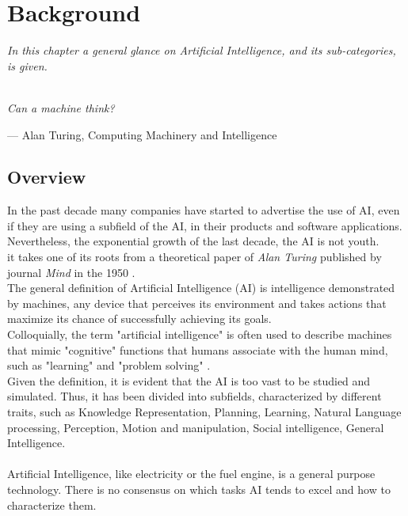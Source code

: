 \chapter{Background}
\textit{In this chapter a general glance on Artificial Intelligence, and its sub-categories, is given.}\\\\

\epigraph{ \textit{Can a machine think?}}{--- \textup{Alan Turing}, Computing Machinery and Intelligence}

\section{Overview}
In the past decade many companies have started to advertise the use of AI, even if they are using a subfield of the AI, in their products and software applications. Nevertheless, the exponential growth of the last decade,
the AI is not youth.\\ it takes one of its roots from a theoretical paper of \textit{Alan Turing} published by journal \textit{Mind} in the 1950 \cite{paper:36}.\\

The general definition of Artificial Intelligence (AI) is intelligence demonstrated by machines, any device that perceives its environment and takes actions that maximize its chance of successfully achieving its goals.\\ Colloquially, the term "artificial intelligence" is often used to describe machines that mimic "cognitive" functions that humans associate with the human mind, such as "learning" and "problem solving" .\\
Given the definition, it is evident that the AI is too vast to be studied and simulated. Thus, it has been divided into subfields, characterized by different traits, such as Knowledge Representation, Planning, Learning, Natural Language processing, Perception, Motion and manipulation, Social intelligence, General Intelligence.\\\\

Artificial Intelligence, like electricity or the fuel engine, is a general purpose technology. There is no consensus on which tasks AI tends to excel and how to characterize them.

